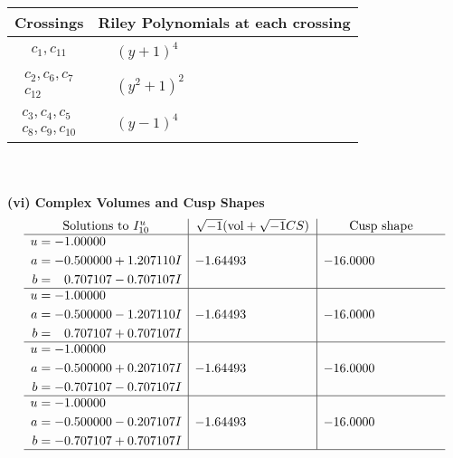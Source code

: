 \documentclass[1p]{elsarticle_modified}
\theoremstyle{definition}
\newcommand{\I}{\sqrt{-1}}
\begin{document}
\begin{tabular}{m{50pt}|m{274pt}}
Crossings & \hspace{64pt}Riley Polynomials at each crossing \\
\hline $$\begin{aligned}c_{1},c_{11}\end{aligned}$$&$\begin{aligned}
&(y+1)^4
\end{aligned}$\\
\hline $$\begin{aligned}c_{2},c_{6},c_{7}\\c_{12}\end{aligned}$$&$\begin{aligned}
&(y^2+1)^2
\end{aligned}$\\
\hline $$\begin{aligned}c_{3},c_{4},c_{5}\\c_{8},c_{9},c_{10}\end{aligned}$$&$\begin{aligned}
&(y-1)^4
\end{aligned}$\\
\hline
\end{tabular}\\~\\
\newpage\flushleft \textbf{(vi) Complex Volumes and Cusp Shapes}
$$\begin{array}{c|c|c}  
\text{Solutions to }I^u_{10}& \I (\text{vol} + \sqrt{-1}CS) & \text{Cusp shape}\\
 \hline 
\begin{aligned}
u &= -1.00000\phantom{ +0.000000I} \\
a &= -0.500000 + 1.207110 I \\
b &= \phantom{-}0.707107 - 0.707107 I\end{aligned}
 & -1.64493\phantom{ +0.000000I} & -16.0000\phantom{ +0.000000I} \\ \hline\begin{aligned}
u &= -1.00000\phantom{ +0.000000I} \\
a &= -0.500000 - 1.207110 I \\
b &= \phantom{-}0.707107 + 0.707107 I\end{aligned}
 & -1.64493\phantom{ +0.000000I} & -16.0000\phantom{ +0.000000I} \\ \hline\begin{aligned}
u &= -1.00000\phantom{ +0.000000I} \\
a &= -0.500000 + 0.207107 I \\
b &= -0.707107 - 0.707107 I\end{aligned}
 & -1.64493\phantom{ +0.000000I} & -16.0000\phantom{ +0.000000I} \\ \hline\begin{aligned}
u &= -1.00000\phantom{ +0.000000I} \\
a &= -0.500000 - 0.207107 I \\
b &= -0.707107 + 0.707107 I\end{aligned}
 & -1.64493\phantom{ +0.000000I} & -16.0000\phantom{ +0.000000I}\\
 \hline 
 \end{array}$$\newpage\newpage\renewcommand{\arraystretch}{1}
\end{document}
